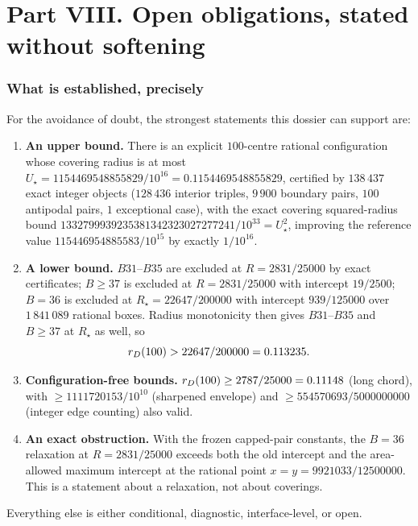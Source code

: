 \part*{Part VIII. Open obligations, stated without softening}
\setcounter{section}{0}

\section{What is established, precisely}

For the avoidance of doubt, the strongest statements this dossier can support are:

\begin{enumerate}[leftmargin=1.6em,itemsep=3pt]
\item \textbf{An upper bound.} There is an explicit $100$-centre rational configuration whose
covering radius is at most $U_\star=1154469548855829/10^{16}=0.1154469548855829$, certified by
$138\,437$ exact integer objects ($128\,436$ interior triples, $9\,900$ boundary pairs, $100$
antipodal pairs, $1$ exceptional case), with the exact covering squared-radius bound
$1332799939235381342323027277241/10^{33}=U_\star^2$, improving the reference value
$115446954885583/10^{15}$ by exactly $1/10^{16}$.
\item \textbf{A lower bound.} $B31$--$B35$ are excluded at $R=2831/25000$ by exact certificates;
$B\ge37$ is excluded at $R=2831/25000$ with intercept $19/2500$; $B=36$ is excluded at
$R_\star=22647/200000$ with intercept $939/125000$ over $1\,841\,089$ rational boxes. Radius
monotonicity then gives $B31$--$B35$ and $B\ge37$ at $R_\star$ as well, so
\[
r_{D}(100)>22647/200000=0.113235 .
\]
\item \textbf{Configuration-free bounds.} $r_{D}(100)\ge2787/25000=0.11148$ (long chord), with
$\ge1111720153/10^{10}$ (sharpened envelope) and $\ge554570693/5000000000$ (integer edge counting)
also valid.
\item \textbf{An exact obstruction.} With the frozen capped-pair constants, the $B=36$ relaxation at
$R=2831/25000$ exceeds both the old intercept and the area-allowed maximum intercept at the rational
point $x=y=9921033/12500000$. This is a statement about a relaxation, not about coverings.
\end{enumerate}

Everything else is either conditional, diagnostic, interface-level, or open.

